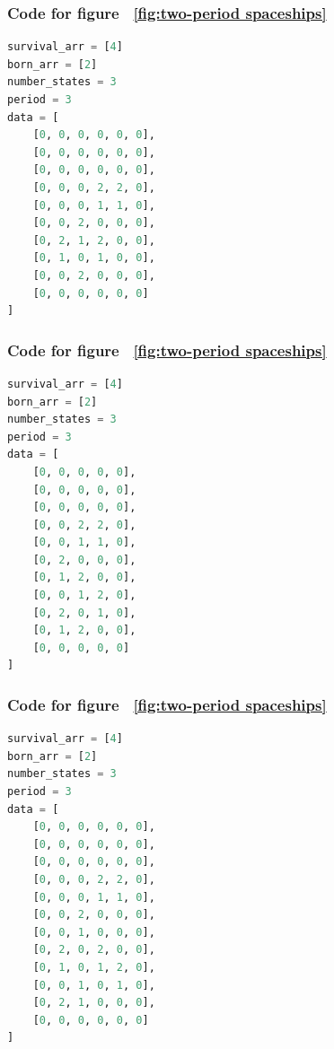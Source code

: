 \documentclass[12pt]{article}
\numberwithin{figure}{section} %
\begin{document}
\hfill
\begin{minipage}{.45\textwidth}
\subsubsection{Code for figure ~\ref{fig:two-period spaceships}}
\label{subsubsection:two-period spaceships(1/5)}
\begin{lstlisting}[language = Python]
survival_arr = [4]
born_arr = [2]
number_states = 3
period = 3
data = [
    [0, 0, 0, 0, 0, 0],
    [0, 0, 0, 0, 0, 0],
    [0, 0, 0, 0, 0, 0],
    [0, 0, 0, 2, 2, 0],
    [0, 0, 0, 1, 1, 0],
    [0, 0, 2, 0, 0, 0],
    [0, 2, 1, 2, 0, 0],
    [0, 1, 0, 1, 0, 0],
    [0, 0, 2, 0, 0, 0],
    [0, 0, 0, 0, 0, 0]
]
\end{lstlisting}
\end{minipage}

\noindent\begin{minipage}{.45\textwidth}
\subsubsection{Code for figure ~\ref{fig:two-period spaceships}}
\label{subsubsection:two-period spaceships(2/5)}
\begin{lstlisting}[language = Python]
survival_arr = [4]
born_arr = [2]
number_states = 3
period = 3
data = [
    [0, 0, 0, 0, 0],
    [0, 0, 0, 0, 0],
    [0, 0, 0, 0, 0],
    [0, 0, 2, 2, 0],
    [0, 0, 1, 1, 0],
    [0, 2, 0, 0, 0],
    [0, 1, 2, 0, 0],
    [0, 0, 1, 2, 0],
    [0, 2, 0, 1, 0],
    [0, 1, 2, 0, 0],
    [0, 0, 0, 0, 0]
]
\end{lstlisting}
\end{minipage}\hfill
\begin{minipage}{.45\textwidth}
\subsubsection{Code for figure ~\ref{fig:two-period spaceships}}
\label{subsubsection:two-period spaceships(3/5)}
\begin{lstlisting}[language = Python]
survival_arr = [4]
born_arr = [2]
number_states = 3
period = 3
data = [
    [0, 0, 0, 0, 0, 0],
    [0, 0, 0, 0, 0, 0],
    [0, 0, 0, 0, 0, 0],
    [0, 0, 0, 2, 2, 0],
    [0, 0, 0, 1, 1, 0],
    [0, 0, 2, 0, 0, 0],
    [0, 0, 1, 0, 0, 0],
    [0, 2, 0, 2, 0, 0],
    [0, 1, 0, 1, 2, 0],
    [0, 0, 1, 0, 1, 0],
    [0, 2, 1, 0, 0, 0],
    [0, 0, 0, 0, 0, 0]
]
\end{lstlisting}
\end{minipage}
\end{document}
